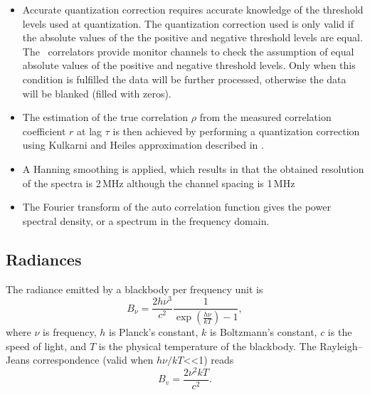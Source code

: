 \begin{itemize}

\item Accurate quantization correction requires accurate knowledge of the threshold
 levels used at quantization. The quantization correction used is only valid 
if the absolute values of the the positive and negative threshold levels are equal. 
The \smr\ correlators provide monitor channels to check the
assumption of equal absolute values of the positive and negative threshold levels.
Only when this condition is fulfilled the data will be further processed,
otherwise the data will be blanked (filled with zeros).

\item The estimation of the true correlation \(\rho\) from the measured correlation
coefficient \(r\) at lag \(\tau\) is then achieved by performing a quantization correction using
Kulkarni and Heiles approximation described in \citet{ohlberg:theod:03}.

\item A Hanning smoothing is applied, which results in that the obtained resolution 
of the spectra is 2\,MHz although the channel spacing is 1\,MHz

\item The Fourier transform of the auto correlation function gives the
power spectral density, or a spectrum in the frequency domain.


\end{itemize}


\subsection{Radiances}


The radiance emitted by a blackbody per frequency unit is
\begin{equation}
 B_{\nu} = \frac{2h\nu^{3}}{c^{2}}\frac{1}{\exp(\frac{h\nu}{kT})-1},
\end{equation}   
where \(\nu\) is frequency, \(h\) is Planck's constant, \(k\) is Boltzmann's constant,
\(c\) is the speed of light, and \(T\) is the physical temperature of the
blackbody.
The Rayleigh--Jeans correspondence (valid when \(h\nu/kT\)<<1) reads
\begin{equation}
 B_{v}=\frac{2\nu^{2}kT}{c^{2}}.
\end{equation}

